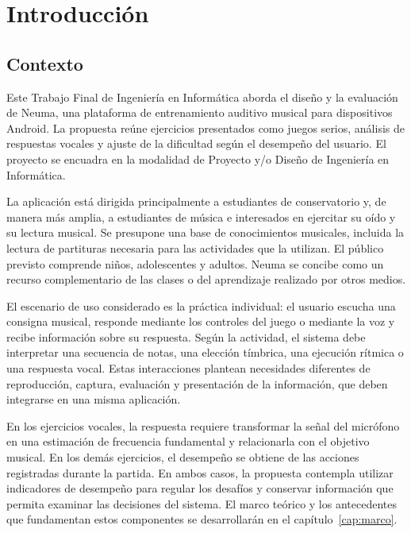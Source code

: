 \chapter{Introducción}
\label{cap:introduccion}
\section{Contexto}
Este Trabajo Final de Ingeniería en Informática aborda el diseño y la evaluación de
Neuma, una plataforma de entrenamiento auditivo musical para dispositivos Android.
La propuesta reúne ejercicios presentados como juegos serios, análisis de respuestas
vocales y ajuste de la dificultad según el desempeño del usuario. El proyecto se
encuadra en la modalidad de Proyecto y/o Diseño de Ingeniería en Informática.

La aplicación está dirigida principalmente a estudiantes de conservatorio y, de manera
más amplia, a estudiantes de música e interesados en ejercitar su oído y su lectura
musical. Se presupone una base de conocimientos musicales, incluida la lectura de
partituras necesaria para las actividades que la utilizan. El público previsto comprende
niños, adolescentes y adultos. Neuma se concibe como un recurso complementario de las
clases o del aprendizaje realizado por otros medios.

El escenario de uso considerado es la práctica individual: el usuario escucha una
consigna musical, responde mediante los controles del juego o mediante la voz y recibe
información sobre su respuesta. Según la actividad, el sistema debe interpretar una
secuencia de notas, una elección tímbrica, una ejecución rítmica o una respuesta vocal.
Estas interacciones plantean necesidades diferentes de reproducción, captura, evaluación
y presentación de la información, que deben integrarse en una misma aplicación.

En los ejercicios vocales, la respuesta requiere transformar la señal del micrófono en
una estimación de frecuencia fundamental y relacionarla con el objetivo musical. En los
demás ejercicios, el desempeño se obtiene de las acciones registradas durante la partida.
En ambos casos, la propuesta contempla utilizar indicadores de desempeño para regular
los desafíos y conservar información que permita examinar las decisiones del sistema.
El marco teórico y los antecedentes que fundamentan estos componentes se desarrollarán
en el capítulo~\ref{cap:marco}.
